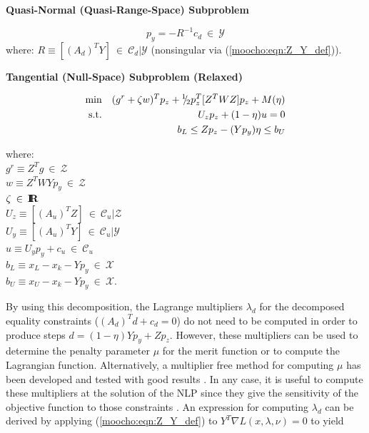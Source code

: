 \documentclass[pdf,12pt,report]{SANDreport}
\begin{document}
{\bsinglespace
\begin{center}\textbf{Quasi-Normal (Quasi-Range-Space) Subproblem}\end{center}
\begin{equation}
p_y = - R^{-1} c_d \:\in\:\mathcal{Y}
\label{moocho:eqn:range_space_step}
\end{equation}
\hspace{4ex}where: $R \equiv [(A_d)^T Y]  \:\in\:\mathcal{C}_d|\mathcal{Y}$
	(nonsingular via (\ref{moocho:eqn:Z_Y_def})). \\[2ex]

\begin{center}\textbf{Tangential (Null-Space) Subproblem (Relaxed)}\end{center}
\begin{eqnarray}
\mbox{min}  &  & (g^r + \zeta w)^T p_z + {}^1 \!\! / \! {}_2 p_z^T [Z^T W Z] p_z + M(\eta)
                 \label{moocho:eqn:moocho:obj} \\
\mbox{s.t.} &  & U_z p_z + (1-\eta) u = 0 
                 \label{moocho:eqn:moocho:equ} \\
            &  & b_L \leq Z p_z - (Y p_y) \eta \leq b_U	
                 \label{moocho:eqn:moocho:inequ}
\end{eqnarray}
\begin{tabbing}
\hspace{4ex}where:\hspace{5ex}\= \\
\>	$g^r \equiv Z^T g \:\in\:\mathcal{Z}$ \\
\>	$w \equiv Z^T W Y p_y \:\in\:\mathcal{Z}$ \\
\>	$\zeta \:\in\:\mbox{\textbf{I}}\hspace{-0.6ex}\mbox{\textbf{R}}$ \\
\>	$U_z \equiv [(A_u)^T Z] \:\in\:\mathcal{C}_u|\mathcal{Z}$ \\
\>	$U_y \equiv [(A_u)^T Y] \:\in\:\mathcal{C}_u|\mathcal{Y}$ \\
\>  $u   \equiv U_y p_y + c_u \:\in\:\mathcal{C}_u$ \\
\>	$b_L \equiv x_L - x_k - Y p_y \:\in\:\mathcal{X}$ \\
\>	$b_U \equiv x_U - x_k - Y p_y \:\in\:\mathcal{X}$.
\end{tabbing}
\esinglespace}

By using this decomposition, the Lagrange multipliers $\lambda_d$ for the
decomposed equality constraints ($(A_d)^T d + c_d = 0$) do not need to be
computed in order to produce steps $d = (1-\eta) Y p_y + Z p_z$.  However,
these multipliers can be used to determine the penalty parameter $\mu$ for the
merit function {}\cite[page 544]{ref:nocedal_wright_1999} or to compute the
Lagrangian function.  Alternatively, a multiplier free method for computing
$\mu$ has been developed and tested with good results
{}\cite{ref:schmid_rsqp_1994}.  In any case, it is useful to compute these
multipliers at the solution of the NLP since they give the sensitivity of the
objective function to those constraints {}\cite[page
436]{ref:nash_sofer_1996}.  An expression for computing $\lambda_d$ can be
derived by applying (\ref{moocho:eqn:Z_Y_def}) to $Y^T \nabla
L(x,\lambda,\nu)=0$ to yield
\end{document}
